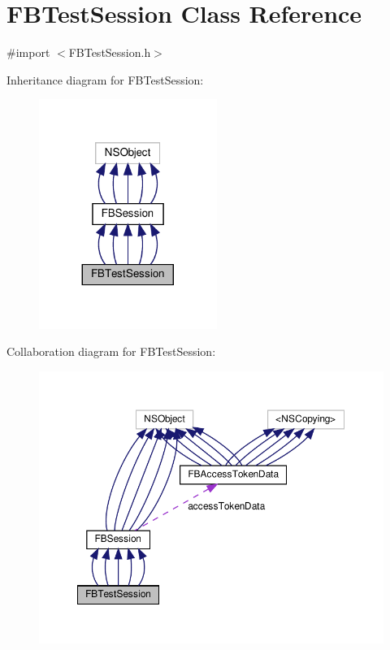 \hypertarget{interfaceFBTestSession}{}\section{F\+B\+Test\+Session Class Reference}
\label{interfaceFBTestSession}


{\ttfamily \#import $<$F\+B\+Test\+Session.\+h$>$}



Inheritance diagram for F\+B\+Test\+Session\+:
\nopagebreak
\begin{figure}[H]
\begin{center}
\leavevmode
\includegraphics[width=164pt]{interfaceFBTestSession__inherit__graph}
\end{center}
\end{figure}


Collaboration diagram for F\+B\+Test\+Session\+:
\nopagebreak
\begin{figure}[H]
\begin{center}
\leavevmode
\includegraphics[width=350pt]{interfaceFBTestSession__coll__graph}
\end{center}
\end{figure}
